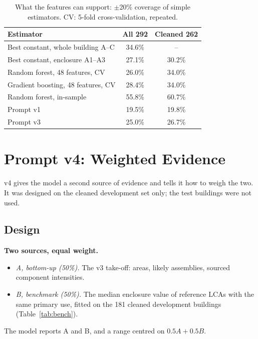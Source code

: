 \documentclass[10pt,letterpaper]{article}
\begin{document}
\begin{table}[t]
\centering\footnotesize
\caption{What the features can support: $\pm$20\% coverage of simple estimators. CV: 5-fold cross-validation, repeated.}
\label{tab:ceiling}
\setlength{\tabcolsep}{3.5pt}
\begin{tabular}{lcc}
\toprule
Estimator & All 292 & Cleaned 262 \\
\midrule
Best constant, whole building A--C & 34.6\% & -- \\
Best constant, enclosure A1--A3 & 27.1\% & 30.2\% \\
Random forest, 48 features, CV & 26.0\% & 34.0\% \\
Gradient boosting, 48 features, CV & 28.4\% & 34.0\% \\
Random forest, in-sample & 55.8\% & 60.7\% \\
\midrule
Prompt v1 & 19.5\% & 19.8\% \\
Prompt v3 & 25.0\% & 26.7\% \\
\bottomrule
\end{tabular}
\end{table}

\section{Prompt v4: Weighted Evidence}
\label{sec:v4}
v4 gives the model a second source of evidence and tells it how to weigh the two. It was designed on the cleaned development set only; the test buildings were not used.

\subsection{Design}
\textbf{Two sources, equal weight.}
\begin{itemize}
\item \emph{A, bottom-up (50\%).} The v3 take-off: areas, likely assemblies, sourced component intensities.
\item \emph{B, benchmark (50\%).} The median enclosure value of reference LCAs with the same primary use, fitted on the 181 cleaned development buildings (Table~\ref{tab:bench}).
\end{itemize}
The model reports A and B, and a range centred on $0.5A+0.5B$.
\end{document}
